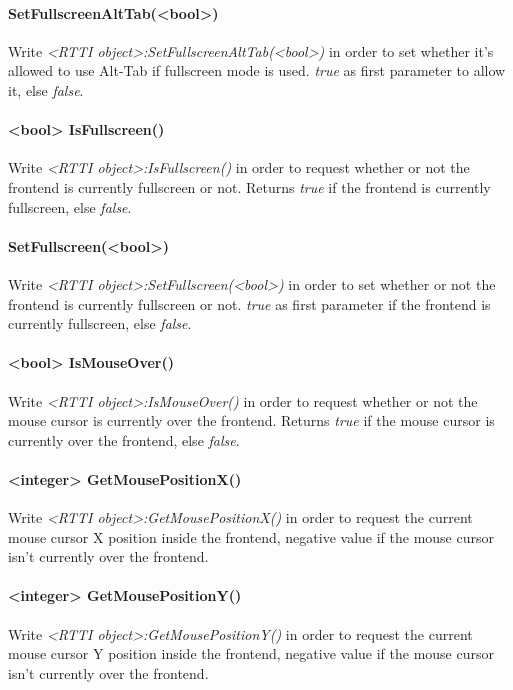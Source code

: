 \paragraph{SetFullscreenAltTab(<bool>)}
Write \emph{<RTTI object>:SetFullscreenAltTab(<bool>)} in order to set whether it's allowed to use Alt-Tab if fullscreen mode is used. \emph{true} as first parameter to allow it, else \emph{false}.

\paragraph{<bool> IsFullscreen()}
Write \emph{<RTTI object>:IsFullscreen()} in order to request whether or not the frontend is currently fullscreen or not. Returns \emph{true} if the frontend is currently fullscreen, else \emph{false}.

\paragraph{SetFullscreen(<bool>)}
Write \emph{<RTTI object>:SetFullscreen(<bool>)} in order to set whether or not the frontend is currently fullscreen or not. \emph{true} as first parameter if the frontend is currently fullscreen, else \emph{false}.

\paragraph{<bool> IsMouseOver()}
Write \emph{<RTTI object>:IsMouseOver()} in order to request whether or not the mouse cursor is currently over the frontend. Returns \emph{true} if the mouse cursor is currently over the frontend, else \emph{false}.

\paragraph{<integer> GetMousePositionX()}
Write \emph{<RTTI object>:GetMousePositionX()} in order to request the current mouse cursor X position inside the frontend, negative value if the mouse cursor isn't currently over the frontend.

\paragraph{<integer> GetMousePositionY()}
Write \emph{<RTTI object>:GetMousePositionY()} in order to request the current mouse cursor Y position inside the frontend, negative value if the mouse cursor isn't currently over the frontend.

